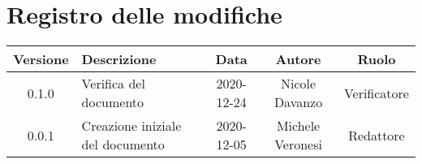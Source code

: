 \section*{Registro delle modifiche}

\begin{center}
	\begin{longtable}{|c|p{5cm}|c|c|c|}
	\hline
	\rowcolor{lighter-grayer}
	\textbf{Versione} & \textbf{Descrizione} & \textbf{Data} & \textbf{Autore} & \textbf{Ruolo} \\
	\hline
	\endfirsthead


	\hline
	0.1.0 & Verifica del documento & 2020-12-24 & Nicole Davanzo & Verificatore \\
	0.0.1 & Creazione iniziale del documento & 2020-12-05 & Michele Veronesi & Redattore \\
	\hline

	\end{longtable}
\end{center}